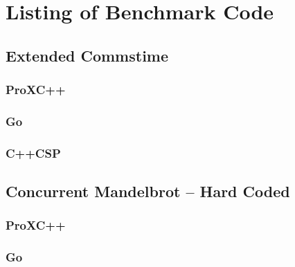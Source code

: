 

\chapter{Listing of Benchmark Code}
\label{ch:benchmark_code}

\section*{Extended Commstime}

\subsection*{ProXC++}


\subsection*{Go}


\subsection*{C++CSP}


\section*{Concurrent Mandelbrot -- Hard Coded}

\subsection*{ProXC++}


\subsection*{Go}


